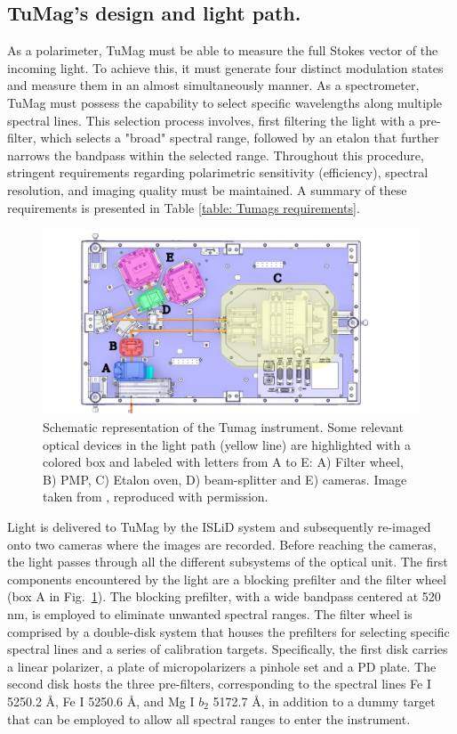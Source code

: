 \subsection{TuMag's design and light path.}

As a polarimeter, TuMag must be able to measure the full Stokes vector of the incoming light. To achieve this, it must generate four distinct modulation states and measure them in an almost simultaneously manner. As a spectrometer, TuMag must possess the capability to select specific wavelengths along multiple spectral lines. This selection process involves, first filtering the light with a pre-filter, which selects a "broad" spectral range, followed by an etalon that further narrows the bandpass within the selected range. Throughout this procedure, stringent requirements regarding polarimetric sensitivity (efficiency), spectral resolution, and imaging quality must be maintained. A summary of these requirements is presented in Table \ref{table: Tumags requirements}.

\begin{figure}[t]
    \includegraphics[width=\textwidth]{figures/TuMag/Scheme.pdf}
    \caption[Tumag schematic.]{Schematic representation of the Tumag instrument. Some relevant optical devices in the light path (yellow line) are highlighted with a colored box and labeled with letters from A to E: A) Filter wheel, B) PMP, C) Etalon oven, D) beam-splitter and E) cameras. Image taken from \cite{tumag}, reproduced with permission.      
    \label{fig_tumag:scheme}}
\end{figure}

Light is delivered to TuMag by the ISLiD system and subsequently re-imaged onto two cameras where the images are recorded. Before reaching the cameras, the light passes through all the different subsystems of the optical unit. The first components encountered by the light are a blocking prefilter and the filter wheel (box A in Fig.~\ref{fig_tumag:scheme}). The blocking prefilter, with a wide bandpass centered at 520 nm, is employed to eliminate unwanted spectral ranges. The filter wheel is comprised by a double-disk system \citep{filter-wheels} that houses the prefilters for selecting specific spectral lines and a series of calibration targets. Specifically, the first disk carries a linear polarizer, a plate of micropolarizers a pinhole set and a PD plate. The second disk hosts the three pre-filters, corresponding to the spectral lines Fe I 5250.2 \r{A}, Fe I 5250.6 \r{A}, and Mg I $b_2$ 5172.7 \r{A}, in addition to a dummy target that can be employed to allow all spectral ranges to enter the instrument.

